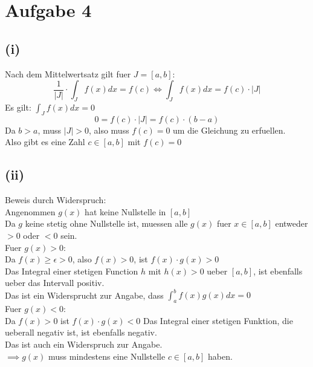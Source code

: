 \documentclass{article}
\begin{document}
\section*{Aufgabe 4}
\subsection*{(i)}
Nach dem Mittelwertsatz gilt fuer $J = [a,b]$:
\[\frac{1}{|J|} \cdot \int_{J} f(x)dx =  f(c) \Longleftrightarrow \int_J f(x) dx = f(c) \cdot |J| \]
Es gilt: $\int_J f(x) dx = 0$
\[0 = f(c) \cdot |J| = f(c) \cdot (b - a)\]
Da $b > a$, muss $|J| > 0$, also muss $f(c) = 0$ um die Gleichung zu erfuellen.  \\
Also gibt es eine Zahl $c \in [a, b]$ mit $f(c) = 0$

\subsection*{(ii)}
Beweis durch Widerspruch: \\ 
Angenommen $g(x)$ hat keine Nullstelle in $[a,b]$ \\
Da $g$ keine stetig ohne Nullstelle ist, muessen alle $g(x)$ fuer $x \in [a,b]$ entweder $> 0$ oder $< 0$ sein. \\
\newline
Fuer $g(x) > 0$: \\
Da $f(x) \geq \epsilon > 0$, also $f(x) > 0$, ist $f(x) \cdot g(x) > 0$ \\
Das Integral einer stetigen Function $h$ mit $h(x) > 0$ ueber $[a,b]$, ist ebenfalls ueber das Intervall positiv. \\
Das ist ein Widersprucht zur Angabe, dass $\int_{a}^{b}f(x)g(x)dx = 0$ \\
\newline
Fuer $g(x) < 0$: \\
Da $f(x) > 0$ ist $f(x) \cdot g(x) < 0$
Das Integral einer stetigen Funktion, die ueberall negativ ist, ist ebenfalls negativ. \\
Das ist auch ein Widerspruch zur Angabe. \\
\newline
$\implies g(x)$ muss mindestens eine Nullstelle $c \in [a,b]$ haben. 
\end{document}
